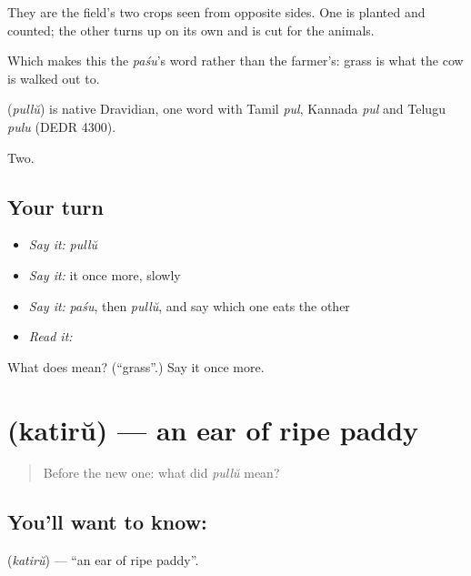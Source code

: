 They are the field's two crops seen from opposite sides. One is planted and counted; the other turns up on its own and is cut for the animals.

Which makes this the \emph{paśu}'s word rather than the farmer's: grass is what the cow is walked out to.

\begin{cousinweb}
\textbf{} (\emph{pullŭ}) is native Dravidian, one word with Tamil \emph{pul}, Kannada \emph{pul} and Telugu \emph{pulu} (DEDR 4300).
\end{cousinweb}

\begin{grammarlens}[title={What you've built}]
Two.
\end{grammarlens}

\subsection*{Your turn}
\begin{itemize}
\raggedright
  \item \emph{Say it:} \emph{pullŭ}
  \item \emph{Say it:} it once more, slowly
  \item \emph{Say it:} \emph{paśu}, then \emph{pullŭ}, and say which one eats the other
  \item \emph{Read it:} \textbf{}
\end{itemize}

\begin{tcolorbox}[breakable,colback=teal!4,colframe=teal!35!black,title={Before you move on}]
What does  mean? (\textquotedblleft{}grass\textquotedblright{}.) Say it once more.
\end{tcolorbox}
\section[\texorpdfstring{\ml{കതിര്} (katirŭ)}{കതിര് (katirŭ)}]{ (katirŭ) — an ear of ripe paddy}

\label{lesson:ML-C66-ear-of-grain}



\begin{quote}
Before the new one: what did \emph{pullŭ} mean?
\end{quote}

\subsection*{You'll want to know: }
\textbf{} (\emph{katirŭ}) — \textquotedblleft{}an ear of ripe paddy\textquotedblright{}.

